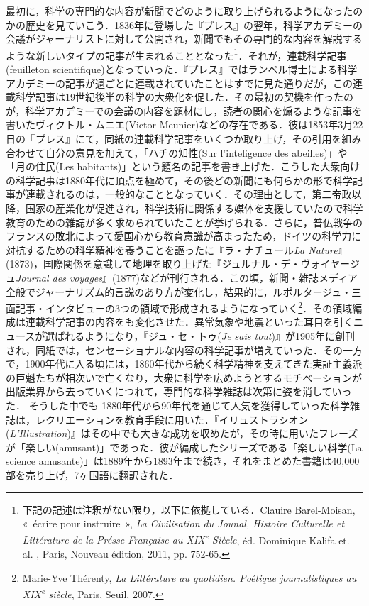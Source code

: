 最初に，科学の専門的な内容が新聞でどのように取り上げられるようになったのかの歴史を見ていこう．1836年に登場した『プレス』の翌年，科学アカデミーの会議がジャーナリストに対して公開され，新聞でもその専門的な内容を解説するような新しいタイプの記事が生まれることとなった\footnote{下記の記述は注釈がない限り，以下に依拠している．Clauire Barel-Moisan, «~écrire pour instruire~», \emph{La Civilisation du Jounal, Histoire Culturelle et Littérature de la Présse Française au XIX\textsuperscript{e} Siècle}, éd. Dominique Kalifa et. al. , Paris, Nouveau édition, 2011, pp. 752-65.}．それが，連載科学記事(feuilleton scientifique)となっていった．『プレス』ではランベル博士による科学アカデミーの記事が週ごとに連載されていたことはすでに見た通りだが，この連載科学記事は19世紀後半の科学の大衆化を促した．その最初の契機を作ったのが，科学アカデミーでの会議の内容を題材にし，読者の関心を煽るような記事を書いたヴィクトル・ムニエ(Victor Meunier)などの存在である．彼は1853年3月22日の『プレス』にて，同紙の連載科学記事をいくつか取り上げ，その引用を組み合わせて自分の意見を加えて，「ハチの知性(Sur l'inteligence des abeilles)」や「月の住民(Les habitants)」という題名の記事を書き上げた．こうした大衆向けの科学記事は1880年代に頂点を極めて，その後どの新聞にも何らかの形で科学記事が連載されるのは，一般的なこととなっていく．その理由として，第二帝政以降，国家の産業化が促進され，科学技術に関係する媒体を支援していたので科学教育のための雑誌が多く求められていたことが挙げられる．さらに，普仏戦争のフランスの敗北によって愛国心から教育意識が高まったため，ドイツの科学力に対抗するための科学精神を養うことを謳ったに『ラ・ナチュール\emph{La Nature}』(1873)，国際関係を意識して地理を取り上げた『ジュルナル・デ・ヴォイヤージュ\emph{Journal des voyages}』(1877)などが刊行される．この頃，新聞・雑誌メディア全般でジャーナリズム的言説のあり方が変化し，結果的に，ルポルタージュ・三面記事・インタビューの3つの領域で形成されるようになっていく\footnote{Marie-Yve Thérenty, \emph{La Littérature au quotidien. Poétique journalistiques au XIX\textsuperscript{e} siècle}, Paris, Seuil, 2007.}．その領域編成は連載科学記事の内容をも変化させた．異常気象や地震といった耳目を引くニュースが選ばれるようになり，『ジュ・セ・トゥ(\emph{Je sais tout})』が1905年に創刊され，同紙では，センセーショナルな内容の科学記事が増えていった．その一方で，1900年代に入る頃には，1860年代から続く科学精神を支えてきた実証主義派の巨魁たちが相次いで亡くなり，大衆に科学を広めようとするモチベーションが出版業界から去っていくにつれて，専門的な科学雑誌は次第に姿を消していった．
そうした中でも 1880年代から90年代を通じて人気を獲得していった科学雑誌は，レクリエーションを教育手段に用いた．『イリュストラシオン(\emph{L'Illustration})』はその中でも大きな成功を収めたが，その時に用いたフレーズが「楽しい(amusant)」であった．彼が編成したシリーズである「楽しい科学(La science amusante)」は1889年から1893年まで続き，それをまとめた書籍は40,000部を売り上げ，7ヶ国語に翻訳された．

